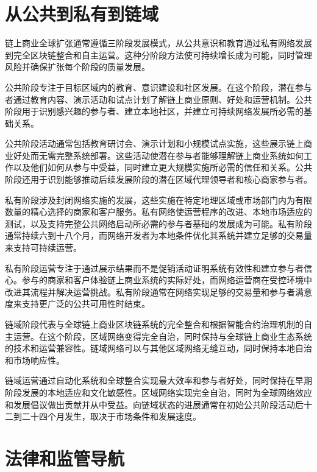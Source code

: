 \documentclass[
  Letterpaper,
]{scrbook}
\begin{document}
\section{从公共到私有到链域}\label{ux4eceux516cux5171ux5230ux79c1ux6709ux5230ux94feux57df}

链上商业全球扩张通常遵循三阶段发展模式，从公共意识和教育通过私有网络发展到完全区块链整合和自主运营。这种分阶段方法使可持续增长成为可能，同时管理风险并确保扩张每个阶段的质量发展。

公共阶段专注于目标区域内的教育、意识建设和社区发展。在这个阶段，潜在参与者通过教育内容、演示活动和试点计划了解链上商业原则、好处和运营机制。公共阶段用于识别感兴趣的参与者、建立本地社区，并建立可持续网络发展所必需的基础关系。

公共阶段活动通常包括教育研讨会、演示计划和小规模试点实施，这些展示链上商业好处而无需完整系统部署。这些活动使潜在参与者能够理解链上商业系统如何工作以及他们如何从参与中受益，同时建立更大规模实施所必需的信任和关系。公共阶段还用于识别能够推动后续发展阶段的潜在区域代理领导者和核心商家参与者。

私有阶段涉及封闭网络实施的发展，这些实施在特定地理区域或市场部门内为有限数量的精心选择的商家和客户服务。私有网络使运营程序的改进、本地市场适应的测试，以及支持完整公共网络启动所必需的参与者基础的发展成为可能。私有阶段通常持续六到十八个月，而网络开发者为本地条件优化其系统并建立足够的交易量来支持可持续运营。

私有阶段运营专注于通过展示结果而不是促销活动证明系统有效性和建立参与者信心。参与的商家和客户体验链上商业系统的实际好处，而网络运营商在受控环境中改进其流程并解决运营挑战。私有阶段通常在网络实现足够的交易量和参与者满意度来支持更广泛的公共可用性时结束。

链域阶段代表与全球链上商业区块链系统的完全整合和根据智能合约治理机制的自主运营。在这个阶段，区域网络变得完全自治，同时保持与全球链上商业生态系统的技术和运营兼容性。链域网络可以与其他区域网络无缝互动，同时保持本地自治和市场响应性。

链域运营通过自动化系统和全球整合实现最大效率和参与者好处，同时保持在早期阶段发展的本地适应和文化敏感性。区域网络实现完全自治，同时为全球网络效应和发展倡议做出贡献并从中受益。向链域状态的进展通常在初始公共阶段活动后十二到二十四个月发生，取决于市场条件和发展速度。

\section{法律和监管导航}\label{ux6cd5ux5f8bux548cux76d1ux7ba1ux5bfcux822a}
\end{document}
